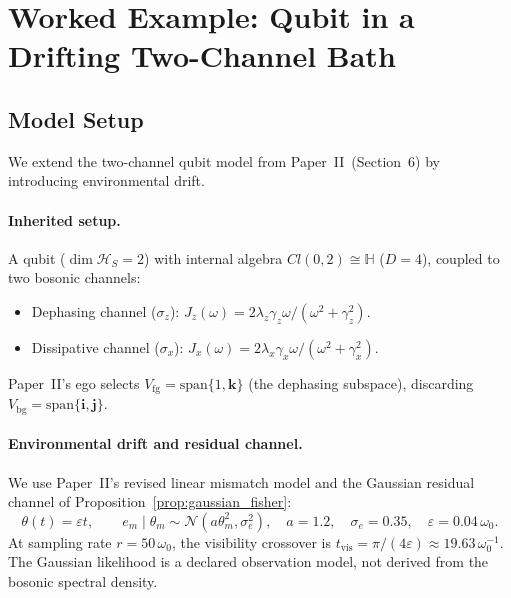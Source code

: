 \documentclass[12pt]{article}
\begin{document}
\section{Worked Example: Qubit in a Drifting
Two-Channel Bath}
\label{sec:example}

\subsection{Model Setup}
\label{subsec:model_III}

We extend the two-channel qubit model from
Paper~II~(Section~6) by introducing environmental drift.

\paragraph{Inherited setup.}
A qubit ($\dim\mathcal{H}_S = 2$) with internal algebra
$Cl(0,2) \cong \mathbb{H}$ ($D = 4$), coupled to two
bosonic channels:
\begin{itemize}
\item Dephasing channel ($\sigma_z$):
  $J_z(\omega) = 2\lambda_z\gamma_z\omega/
  (\omega^2 + \gamma_z^2)$.
\item Dissipative channel ($\sigma_x$):
  $J_x(\omega) = 2\lambda_x\gamma_x\omega/
  (\omega^2 + \gamma_x^2)$.
\end{itemize}
Paper~II's ego selects $V_{\mathrm{fg}}
= \mathrm{span}\{1,\mathbf{k}\}$ (the dephasing subspace),
discarding $V_{\mathrm{bg}}
= \mathrm{span}\{\mathbf{i},\mathbf{j}\}$.

\paragraph{Environmental drift and residual channel.}
We use Paper~II's revised linear mismatch model and the Gaussian
residual channel of Proposition~\ref{prop:gaussian_fisher}:
\begin{equation}
\label{eq:drift_model}
\theta(t)=\varepsilon t,\qquad
e_m\mid\theta_m\sim\mathcal N(a\theta_m^2,\sigma_e^2),
\quad a=1.2,\quad\sigma_e=0.35,\quad
\varepsilon=0.04\,\omega_0.
\end{equation}
At sampling rate $r=50\,\omega_0$, the visibility crossover is
$t_{\mathrm{vis}}=\pi/(4\varepsilon)\approx19.63\,\omega_0^{-1}$.
The Gaussian likelihood is a declared observation model, not derived
from the bosonic spectral density.
\end{document}
